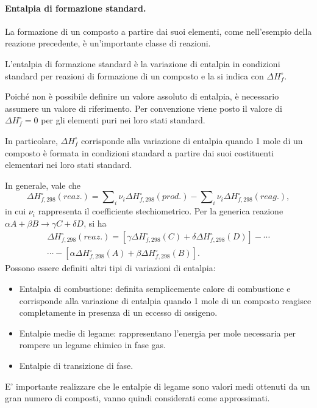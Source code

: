 \paragraph{Entalpia di formazione standard.} La formazione di un composto a partire dai suoi elementi, come nell'esempio della reazione precedente, è
un'importante classe di reazioni.
\begin{defn}\label{defn:15}
        L'entalpia di formazione standard è la variazione di entalpia in condizioni standard per reazioni di formazione di un composto e la si indica con $\Delta H_f^\circ$.
\end{defn}
Poiché non è possibile definire un valore assoluto di entalpia, è necessario assumere un valore di riferimento. Per convenzione viene posto il valore di $\Delta H_f^\circ=0$ per gli elementi puri nei loro stati standard.
\begin{obs}
    In particolare, $\Delta H_f^\circ$ corrisponde alla variazione di entalpia quando 1 mole di un composto è formata in condizioni standard a partire dai suoi costituenti elementari nei loro stati standard.
\end{obs}
In generale, vale che
\begin{equation}
    \Delta H_{f,298}^\circ(reaz.)=\sum\nolimits_i\nu_{i}\Delta H_{f,298}^\circ(prod.)-\sum\nolimits_i\nu_i\Delta H_{f,298}^\circ(reag.),
\end{equation}
in cui $\nu_i$ rappresenta il coefficiente stechiometrico. Per la generica reazione $\alpha A+\beta B\to \gamma C+ \delta D$, si ha 
\begin{equation}
    \begin{aligned}
        \Delta H_{f,298}^\circ(reaz.)=[\gamma\Delta H_{f,298}^\circ(C)+\delta\Delta H_{f,298}^\circ(D)]-\cdots\\
        \cdots-[\alpha\Delta H_{f,298}^\circ(A)+\beta\Delta H_{f,298}^\circ(B)].
    \end{aligned}
\end{equation}
Possono essere definiti altri tipi di variazioni di entalpia:
\begin{itemize}
    \item Entalpia di combustione: definita semplicemente calore di combustione e corrisponde alla
    variazione di entalpia quando 1 mole di un composto reagisce completamente in presenza di un eccesso di ossigeno.
    \item Entalpie medie di legame:  rappresentano l'energia per mole necessaria per rompere un legame chimico in
    fase gas.
    \item Entalpie di transizione di fase.
\end{itemize}
\begin{obs}
    E' importante realizzare che le entalpie di legame sono valori medi ottenuti da un gran numero di composti, vanno quindi considerati come approssimati.
\end{obs}

